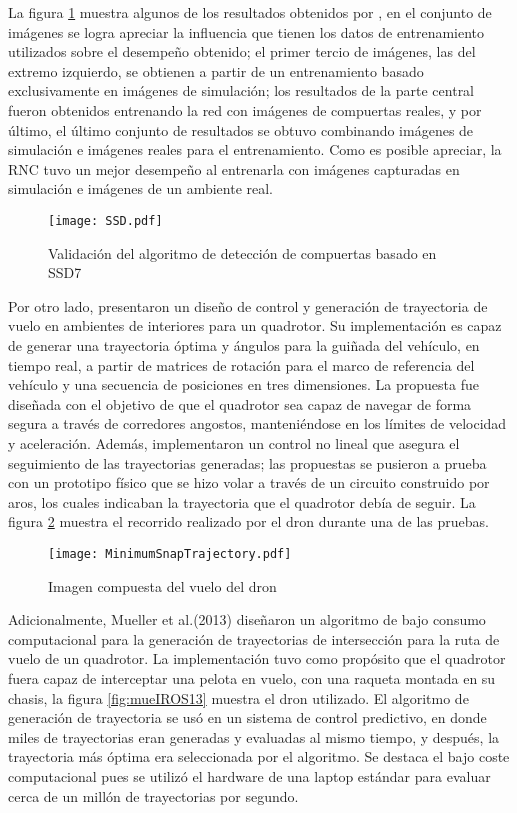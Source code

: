 La figura \ref{fig:SSD} muestra algunos de los resultados obtenidos por \citet{cabrera2019gate}, en el conjunto de imágenes se logra apreciar la influencia que tienen los datos de entrenamiento utilizados sobre el desempeño obtenido; el primer tercio de imágenes, las del extremo izquierdo, se obtienen a partir de un entrenamiento basado exclusivamente en imágenes de simulación; los resultados de la parte central fueron obtenidos entrenando la red con imágenes de compuertas reales, y por último, el último conjunto de resultados se obtuvo combinando imágenes de simulación e imágenes reales para el entrenamiento. Como es posible apreciar, la RNC tuvo un mejor desempeño al entrenarla con imágenes capturadas en simulación e imágenes de un ambiente real.

\begin{figure}[ht]
    \centering
    \texttt{[image: SSD.pdf]}
    \caption{Validación del algoritmo de detección de compuertas basado en SSD7 \citet{cabrera2019gate}}
    \label{fig:SSD}
\end{figure}

Por otro lado, \citet{mellinger2011minimum} presentaron un diseño de control y generación de trayectoria de vuelo en ambientes de interiores para un quadrotor. Su implementación es capaz de generar una trayectoria óptima y ángulos para la guiñada del vehículo, en tiempo real, a partir de matrices de rotación para el marco de referencia del vehículo y una secuencia de posiciones en tres dimensiones. La propuesta fue diseñada con el objetivo de que el quadrotor sea capaz de navegar de forma segura a través de corredores angostos, manteniéndose en los límites de velocidad y aceleración. Además, implementaron un control no lineal que asegura el seguimiento de las trayectorias generadas; las propuestas se pusieron a prueba con un prototipo físico  que se hizo volar a través de un circuito construido por aros, los cuales indicaban la trayectoria que el quadrotor debía de seguir. La figura \ref{fig:MinimumSnapTrajectory} muestra el recorrido realizado por el dron durante una de las pruebas.

\begin{figure}[ht]
    \centering
    \texttt{[image: MinimumSnapTrajectory.pdf]}
    \caption{Imagen compuesta del vuelo del dron \citet{mellinger2011minimum}}
    \label{fig:MinimumSnapTrajectory}
\end{figure}

Adicionalmente, Mueller et al.(2013)\citet{mueller2013computationally} diseñaron un algoritmo de bajo consumo computacional para la generación de trayectorias de intersección para la ruta de vuelo de un quadrotor. La implementación tuvo como propósito que el quadrotor fuera capaz de interceptar una pelota en vuelo, con una raqueta montada en su chasis, la figura \ref{fig:mueIROS13} muestra el dron utilizado. El algoritmo de generación de trayectoria se usó en un sistema de control predictivo, en donde miles de trayectorias eran generadas y evaluadas al mismo tiempo, y después, la trayectoria más óptima era seleccionada por el algoritmo.  Se destaca el bajo coste computacional pues se utilizó el hardware de una laptop estándar para evaluar cerca de un millón de trayectorias por segundo.

